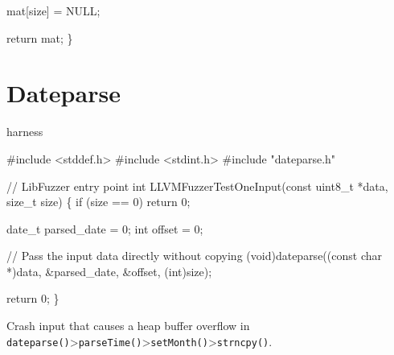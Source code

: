 \documentclass[
  a4paper,
]{scrreprt}
\newenvironment{Shaded}{\begin{snugshade}}{\end{snugshade}}
\newcommand{\CommentTok}[1]{\textcolor[rgb]{0.41,0.41,0.41}{#1}}
\newcommand{\ControlFlowTok}[1]{\textcolor[rgb]{0.85,0.12,0.09}{#1}}
\newcommand{\DataTypeTok}[1]{\textcolor[rgb]{0.47,0.16,0.63}{#1}}
\newcommand{\DecValTok}[1]{\textcolor[rgb]{0.47,0.16,0.63}{#1}}
\newcommand{\ImportTok}[1]{\textcolor[rgb]{0.33,0.33,0.33}{#1}}
\newcommand{\NormalTok}[1]{\textcolor[rgb]{0.33,0.33,0.33}{#1}}
\newcommand{\OperatorTok}[1]{\textcolor[rgb]{0.00,0.46,0.62}{#1}}
\newcommand{\PreprocessorTok}[1]{\textcolor[rgb]{0.47,0.16,0.63}{#1}}
\theoremstyle{definition}
\theoremstyle{remark}
\begin{document}
\begin{Shaded}
\begin{Highlighting}[numbers=left,,]
\NormalTok{  mat}\OperatorTok{[}\NormalTok{size}\OperatorTok{]} \OperatorTok{=}\NormalTok{ NULL}\OperatorTok{;}

  \ControlFlowTok{return}\NormalTok{ mat}\OperatorTok{;}
\OperatorTok{\}}
\end{Highlighting}
\end{Shaded}

\section{Dateparse}\label{dateparse}

harness

\begin{Shaded}
\begin{Highlighting}[numbers=left,,]
\PreprocessorTok{\#include }\ImportTok{\textless{}stddef.h\textgreater{}}
\PreprocessorTok{\#include }\ImportTok{\textless{}stdint.h\textgreater{}}
\PreprocessorTok{\#include }\ImportTok{"dateparse.h"}

\CommentTok{// LibFuzzer entry point}
\DataTypeTok{int}\NormalTok{ LLVMFuzzerTestOneInput}\OperatorTok{(}\DataTypeTok{const} \DataTypeTok{uint8\_t} \OperatorTok{*}\NormalTok{data}\OperatorTok{,} \DataTypeTok{size\_t}\NormalTok{ size}\OperatorTok{)} \OperatorTok{\{}
    \ControlFlowTok{if} \OperatorTok{(}\NormalTok{size }\OperatorTok{==} \DecValTok{0}\OperatorTok{)} \ControlFlowTok{return} \DecValTok{0}\OperatorTok{;}

\NormalTok{    date\_t parsed\_date }\OperatorTok{=} \DecValTok{0}\OperatorTok{;}
    \DataTypeTok{int}\NormalTok{ offset }\OperatorTok{=} \DecValTok{0}\OperatorTok{;}

    \CommentTok{// Pass the input data directly without copying}
    \OperatorTok{(}\DataTypeTok{void}\OperatorTok{)}\NormalTok{dateparse}\OperatorTok{((}\DataTypeTok{const} \DataTypeTok{char} \OperatorTok{*)}\NormalTok{data}\OperatorTok{,} \OperatorTok{\&}\NormalTok{parsed\_date}\OperatorTok{,} \OperatorTok{\&}\NormalTok{offset}\OperatorTok{,} \OperatorTok{(}\DataTypeTok{int}\OperatorTok{)}\NormalTok{size}\OperatorTok{);}

    \ControlFlowTok{return} \DecValTok{0}\OperatorTok{;}
\OperatorTok{\}}
\end{Highlighting}
\end{Shaded}

Crash input that causes a heap buffer overflow in
\texttt{dateparse()}\textgreater{}\texttt{parseTime()}\textgreater{}\texttt{setMonth()}\textgreater{}\texttt{strncpy()}.
\end{document}
